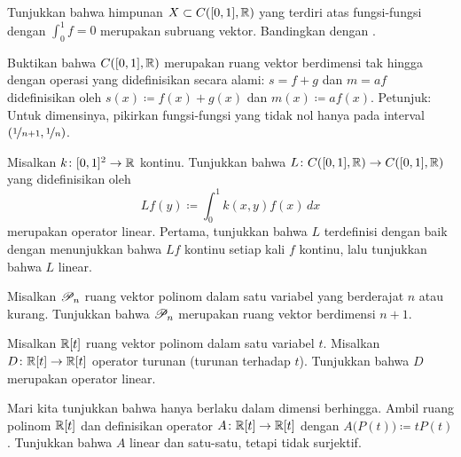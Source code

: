 \begin{exercise} \label{exercise:intzerosubspace}
Tunjukkan bahwa himpunan $X \subset C([0,1],{\mathbb{R}})$ yang terdiri atas fungsi-fungsi
dengan $\int_0^1 f = 0$ merupakan subruang vektor.
Bandingkan dengan .
\end{exercise}

\begin{exercise}[Menantang]
Buktikan bahwa $C([0,1],{\mathbb{R}})$ merupakan ruang vektor berdimensi tak hingga
dengan operasi yang didefinisikan secara alami:
$s=f+g$ dan $m=af$ didefinisikan oleh
$s(x) \coloneqq f(x)+g(x)$ dan
$m(x) \coloneqq a f(x)$.
Petunjuk: Untuk dimensinya, pikirkan fungsi-fungsi yang tidak nol hanya
pada interval $(\nicefrac{1}{n+1},\nicefrac{1}{n})$.
\end{exercise}

\begin{exercise} \label{exercise:continuouskernel}
Misalkan $k \colon [0,1]^2 \to {\mathbb{R}}$ kontinu.  Tunjukkan bahwa
$L \colon C([0,1],{\mathbb{R}}) \to C([0,1],{\mathbb{R}})$ yang didefinisikan oleh
\begin{equation*}
Lf(y) \coloneqq \int_0^1 k(x,y)f(x)\,dx
\end{equation*}
merupakan operator linear.  Pertama, tunjukkan bahwa $L$ terdefinisi dengan baik dengan
menunjukkan bahwa $Lf$ kontinu setiap kali $f$ kontinu, lalu
tunjukkan bahwa $L$ linear.
\end{exercise}

\begin{exercise}
Misalkan ${\mathscr{P}}_n$ ruang vektor polinom dalam satu variabel yang berderajat $n$
atau kurang.  Tunjukkan bahwa ${\mathscr{P}}_n$ merupakan ruang vektor berdimensi $n+1$.
\end{exercise}

\begin{exercise}
Misalkan ${\mathbb{R}}[t]$ ruang vektor polinom dalam satu variabel $t$.  Misalkan
$D \colon {\mathbb{R}}[t] \to {\mathbb{R}}[t]$ operator turunan (turunan terhadap $t$).
Tunjukkan bahwa $D$ merupakan operator linear.
\end{exercise}

\begin{exercise}
Mari kita tunjukkan bahwa  hanya berlaku dalam dimensi
berhingga.  Ambil ruang polinom ${\mathbb{R}}[t]$ dan definisikan operator $A \colon {\mathbb{R}}[t] \to {\mathbb{R}}[t]$
dengan $A\bigl(P(t)\bigr) \coloneqq tP(t)$.  Tunjukkan bahwa $A$ linear dan satu-satu, tetapi
tidak surjektif.
\end{exercise}

